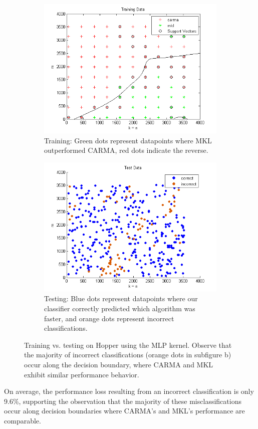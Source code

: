 \begin{figure}[t]
    \centering
        \begin{subfigure}[t]{0.49\textwidth}
            \includegraphics[width=\textwidth]{figures/hopper2D_train_mlp.png}
            \caption{Training: Green dots represent datapoints where MKL outperformed CARMA, red dots indicate the reverse.}
            \label{f:train_hopper_2D}
            \end{subfigure}
        \begin{subfigure}[t]{0.49\textwidth}
            \includegraphics[width=\textwidth]{figures/hopper2D_test_mlp.png}
            \caption{Testing: Blue dots represent datapoints where our classifier correctly predicted which algorithm was faster, and orange dots represent incorrect classifications.}
            \label{f:test_hopper_2D}
        \end{subfigure}
        \caption{Training vs. testing on Hopper using the MLP kernel. Observe that the majority of incorrect classifications (orange dots in subfigure b) occur along the decision boundary, where CARMA and MKL exhibit similar performance behavior.}
    \label{fig:2D}
\end{figure}

On average, the performance loss resulting from an incorrect classification is only 9.6\%, supporting the observation that the majority of these misclassifications occur along decision boundaries where CARMA's and MKL's performance are comparable.
